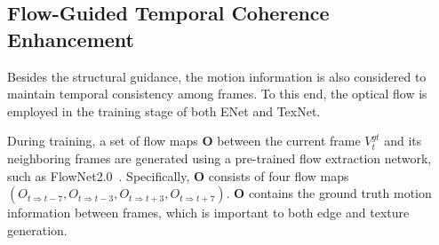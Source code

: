 \subsection{Flow-Guided Temporal Coherence Enhancement}
\label{sec:fec}
Besides the structural guidance, the motion information is also considered to maintain temporal consistency among frames.
To this end, the optical flow is employed in the training stage of both ENet and TexNet.
%

During training, a set of flow maps \(\boldsymbol{O}\) between the current frame $V_t^{gt}$ and its neighboring frames are generated using a pre-trained flow extraction network, such as FlowNet2.0~\cite{Flownet_2017_CVPR}.
Specifically, \(\boldsymbol{O}\) consists of four flow maps \((O_{t\Rightarrow t-7}, O_{t\Rightarrow t-3}, O_{t\Rightarrow t+3}, O_{t\Rightarrow t+7})\).
\(\boldsymbol{O}\) contains the ground truth motion information between frames, which is important to both edge and texture generation.



